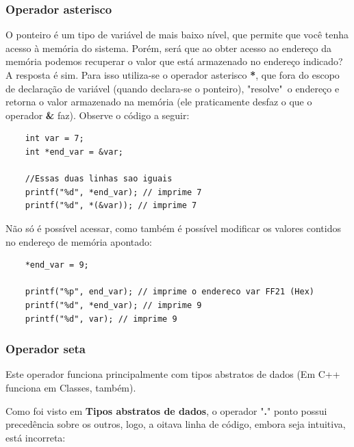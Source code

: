 \documentclass[12pt]{article}
\newcommand\tab[1][1cm]{\hspace*{#1}}
\begin{document}
\subsubsection{Operador asterisco}

\par\tab O ponteiro é um tipo de variável de mais baixo nível, que permite que você tenha acesso à memória do sistema. Porém, será que ao obter acesso ao endereço da memória podemos recuperar o valor que está armazenado no endereço indicado? A resposta é sim. Para isso utiliza-se o operador asterisco \textbf{*}, que fora do escopo de declaração de variável (quando declara-se o ponteiro), "resolve"~o endereço e retorna o valor armazenado na memória (ele praticamente desfaz o que o operador \textbf{\&} faz). Observe o código a seguir:

\hspace{0.25cm}
\begin{lstlisting}
    int var = 7;
    int *end_var = &var;
    
    //Essas duas linhas sao iguais
    printf("%d", *end_var); // imprime 7
    printf("%d", *(&var)); // imprime 7
\end{lstlisting}

\par\tab Não só é possível acessar, como também é possível modificar os valores contidos no endereço de memória apontado:

\hspace{0.25cm}
\begin{lstlisting}
    *end_var = 9;

    printf("%p", end_var); // imprime o endereco var FF21 (Hex)
    printf("%d", *end_var); // imprime 9
    printf("%d", var); // imprime 9
\end{lstlisting}

\newpage

\subsubsection{Operador seta}

\par\tab Este operador funciona principalmente com tipos abstratos de dados (Em C++ funciona em Classes, também).

\par\tab Como foi visto em \textbf{Tipos abstratos de dados}, o operador "\textbf{.}" ponto possui precedência sobre os outros, logo, a oitava linha de código, embora seja intuitiva, está incorreta:
\end{document}
